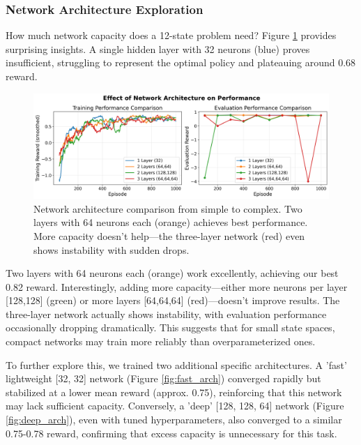 \documentclass[conference]{IEEEtran}
\begin{document}
\subsubsection{Network Architecture Exploration}

How much network capacity does a 12-state problem need? Figure \ref{fig:arch} provides surprising insights. A single hidden layer with 32 neurons (blue) proves insufficient, struggling to represent the optimal policy and plateauing around 0.68 reward.

\begin{figure}[htbp]
\centerline{\includegraphics[width=\columnwidth]{images/experiment_architecture.png}}
\caption{Network architecture comparison from simple to complex. Two layers with 64 neurons each (orange) achieves best performance. More capacity doesn't help—the three-layer network (red) even shows instability with sudden drops.}
\label{fig:arch}
\end{figure}

Two layers with 64 neurons each (orange) work excellently, achieving our best 0.82 reward. Interestingly, adding more capacity—either more neurons per layer [128,128] (green) or more layers [64,64,64] (red)—doesn't improve results. The three-layer network actually shows instability, with evaluation performance occasionally dropping dramatically. This suggests that for small state spaces, compact networks may train more reliably than overparameterized ones.

To further explore this, we trained two additional specific architectures. A 'fast' lightweight [32, 32] network (Figure \ref{fig:fast_arch}) converged rapidly but stabilized at a lower mean reward (approx. 0.75), reinforcing that this network may lack sufficient capacity. Conversely, a 'deep' [128, 128, 64] network (Figure \ref{fig:deep_arch}), even with tuned hyperparameters, also converged to a similar 0.75-0.78 reward, confirming that excess capacity is unnecessary for this task.
\end{document}
